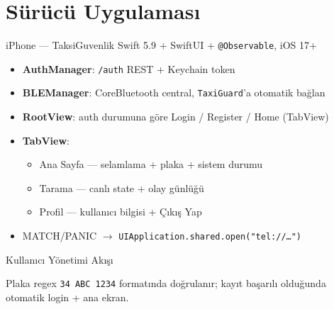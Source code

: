 \documentclass[aspectratio=169,12pt]{beamer}
\begin{document}
\section{Sürücü Uygulaması}

\begin{frame}{iPhone --- TaksiGuvenlik}
    Swift 5.9 + SwiftUI + \texttt{@Observable}, iOS 17+
    \begin{itemize}
        \item \textbf{AuthManager}: \texttt{/auth} REST + Keychain token
        \item \textbf{BLEManager}: CoreBluetooth central, \texttt{TaxiGuard}'a otomatik bağlan
        \item \textbf{RootView}: auth durumuna göre Login / Register / Home (TabView)
        \item \textbf{TabView}:
            \begin{itemize}
                \item Ana Sayfa --- selamlama + plaka + sistem durumu
                \item Tarama --- canlı state + olay günlüğü
                \item Profil --- kullanıcı bilgisi + Çıkış Yap
            \end{itemize}
        \item MATCH/PANIC $\rightarrow$ \texttt{UIApplication.shared.open("tel://\dots")}
    \end{itemize}
\end{frame}

\begin{frame}{Kullanıcı Yönetimi Akışı}
    \begin{center}
    \end{center}

    \vspace{0.2cm}
    Plaka regex \texttt{34 ABC 1234} formatında doğrulanır; kayıt başarılı
    olduğunda otomatik login + ana ekran.
\end{frame}

\end{document}

